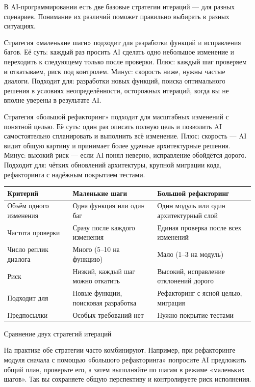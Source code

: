 
В AI-программировании есть две базовые стратегии итераций — для разных сценариев. Понимание их различий поможет правильно выбирать в разных ситуациях.

Стратегия «маленькие шаги» подходит для разработки функций и исправления багов. Её суть: каждый раз просить AI сделать одно небольшое изменение и переходить к следующему только после проверки. Плюс: каждый шаг проверяем и откатываем, риск под контролем. Минус: скорость ниже, нужны частые диалоги. Подходит для: разработки новых функций, поиска оптимального решения в условиях неопределённости, осторожных итераций, когда вы не вполне уверены в результате AI.

Стратегия «большой рефакторинг» подходит для масштабных изменений с понятной целью. Её суть: один раз описать полную цель и позволить AI самостоятельно спланировать и выполнить всё изменение. Плюс: скорость — AI видит общую картину и принимает более удачные архитектурные решения. Минус: высокий риск — если AI понял неверно, исправление обойдётся дорого. Подходит для: чётких обновлений архитектуры, крупной миграции кода, рефакторинга с надёжным покрытием тестами.

\begin{center}
\begin{tabularx}{\linewidth}{|X|X|X|}
\hline
\textbf{Критерий} & \textbf{Маленькие шаги} & \textbf{Большой рефакторинг} \tabularnewline
\hline
Объём одного изменения & Одна функция или один баг & Один модуль или один архитектурный слой \tabularnewline
Частота проверки & Сразу после каждого изменения & Единая проверка после всех изменений \tabularnewline
Число реплик диалога & Много (5–10 на функцию) & Мало (1–3 на модуль) \tabularnewline
Риск & Низкий, каждый шаг можно откатить & Высокий, исправление отклонений дорого \tabularnewline
Подходит для & Новые функции, поисковая разработка & Рефакторинг с ясной целью, миграция \tabularnewline
Предпосылки & Особых требований нет & Нужно покрытие тестами \tabularnewline
\hline
\end{tabularx}
\end{center}

\begin{center}\small\color{gray}Сравнение двух стратегий итераций\end{center}

На практике обе стратегии часто комбинируют. Например, при рефакторинге модуля сначала с помощью «большого рефакторинга» попросите AI предложить общий план, проверьте его, а затем выполняйте по шагам в режиме «маленьких шагов». Так вы сохраняете общую перспективу и контролируете риск исполнения.

